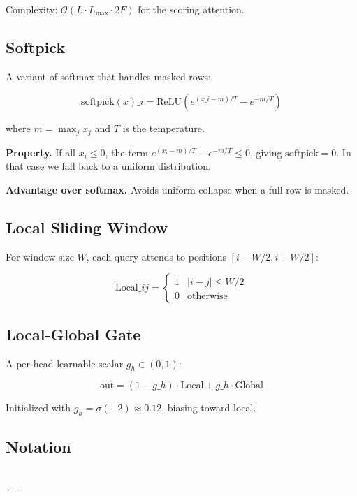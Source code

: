 Complexity: $\mathcal{O}(L \cdot L_\text{max} \cdot 2F)$ for the scoring 
attention.

\subsection{Softpick}

A variant of softmax that handles masked rows:

\[
\text{softpick}(x)\_i = \text{ReLU}\!\left(e^{(x\_i - m)/T} - e^{-m/T}\right)
\tag{3.7}
\]

where $m = \max_j x_j$ and $T$ is the temperature.

\textbf{Property.} If all $x_i \leq 0$, the term $e^{(x_i - m)/T} - e^{-m/T} \leq 0$, 
giving $\text{softpick} = 0$. In that case we fall back to a uniform 
distribution.

\textbf{Advantage over softmax.} Avoids uniform collapse when a full row is 
masked.

\subsection{Local Sliding Window}

For window size $W$, each query attends to positions $[i - W/2, i + W/2]$:

\[
\text{Local}\_{ij} = \begin{cases} 1 & |i - j| \leq W/2 \\ 0 & \text{otherwise} \end{cases}
\tag{3.8}
\]

\subsection{Local-Global Gate}

A per-head learnable scalar $g_h \in (0, 1)$:

\[
\text{out} = (1 - g\_h) \cdot \text{Local} + g\_h \cdot \text{Global}
\tag{3.9}
\]

Initialized with $g_h = \sigma(-2) \approx 0.12$, biasing toward local.

\subsection{Notation}

\begin{lstlisting}

---
\end{lstlisting}